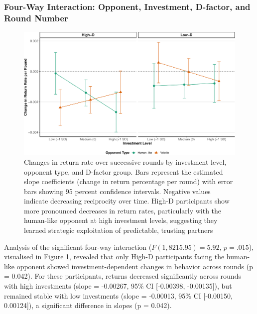 \documentclass[
]{article}
\begin{document}
\subsubsection{Four-Way Interaction: Opponent, Investment, D-factor, and Round Number}\label{four-way-interaction-opponent-investment-d-factor-and-round-number}

\begin{figure}

{\centering \includegraphics{article_files/figure-latex/oppExploit-1} 

}

\caption{Changes in return rate over successive rounds by investment level, opponent type, and D-factor group. Bars represent the estimated slope coefficients (change in return percentage per round) with error bars showing 95 percent confidence intervals. Negative values indicate decreasing reciprocity over time. High-D participants show more pronounced decreases in return rates, particularly with the human-like opponent at high investment levels, suggesting they learned strategic exploitation of predictable, trusting partners}\label{fig:oppExploit}
\end{figure}

Analysis of the significant four-way interaction (\(F(1, 8215.95) = 5.92\), \(p = .015\)), visualised in Figure \ref{fig:oppExploit}, revealed that only High-D participants facing the human-like opponent showed investment-dependent changes in behavior across rounds (p = 0.042). For these participants, returns decreased significantly across rounds with high investments (slope = -0.00267, 95\% CI {[}-0.00398, -0.00135{]}), but remained stable with low investments (slope = -0.00013, 95\% CI {[}-0.00150, 0.00124{]}), a significant difference in slopes (p = 0.042).
\end{document}
